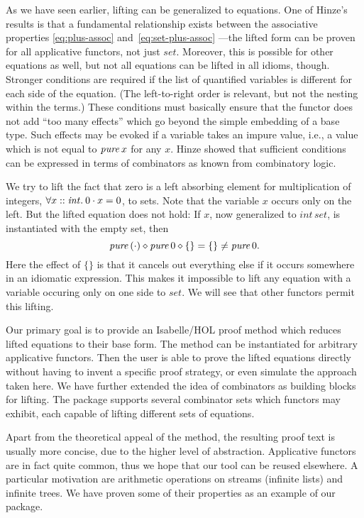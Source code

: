 As we have seen earlier, lifting can be generalized to equations.
One of Hinze's results is that a fundamental relationship exists between the
associative properties \eqref{eq:plus-assoc} and~\eqref{eq:set-plus-assoc}%
---the lifted form can be proven for all applicative functors, not just
$\mathit{set}$.
Moreover, this is possible for other equations as well, but not all equations
can be lifted in all idioms, though.
Stronger conditions are required if the list of quantified variables is
different for each side of the equation.
(The left-to-right order is relevant, but not the nesting within the terms.)
These conditions must basically ensure that the functor does not add ``too many
effects'' which go beyond the simple embedding of a base type.
Such effects may be evoked if a variable takes an impure value, i.e., a value
which is not equal to $\operatorname{\mathit{pure}} x$ for any $x$.
Hinze showed that sufficient conditions can be expressed in terms of combinators
as known from combinatory logic.

\begin{example}\label{exmp:set-counterexmp}
We try to lift the fact that zero is a left absorbing element for
multiplication of integers, $\forall x \mathrel{::} \mathit{int}.\>0 \cdot x = 0$,
to sets.
Note that the variable $x$ occurs only on the left.
But the lifted equation does not hold: If $x$, now generalized to
$\mathit{int}\,\mathit{set}$, is instantiated with the empty set, then
\[ \operatorname{\mathit{pure}}{(\cdot)} \diamond \operatorname{\mathit{pure}} 0 \diamond \{\} = \{\} \ne \operatorname{\mathit{pure}} 0. \]
Here the effect of $\{\}$ is that it cancels out everything else if it occurs
somewhere in an idiomatic expression.
This makes it impossible to lift any equation with a variable occuring only on
one side to $\mathit{set}$.
We will see that other functors permit this lifting.
\end{example}

Our primary goal is to provide an Isabelle/HOL proof method which reduces
lifted equations to their base form.
The method can be instantiated for arbitrary applicative functors.
Then the user is able to prove the lifted equations directly without having to
invent a specific proof strategy, or even simulate the approach taken here.
We have further extended the idea of combinators as building blocks for lifting.
The package supports several combinator sets which functors may exhibit,
each capable of lifting different sets of equations.

Apart from the theoretical appeal of the method, the resulting proof text is
usually more concise, due to the higher level of abstraction.
Applicative functors are in fact quite common, thus we hope that our tool
can be reused elsewhere.
A particular motivation are arithmetic operations on streams (infinite lists)
and infinite trees.
We have proven some of their properties as an example of our package.
\todo


